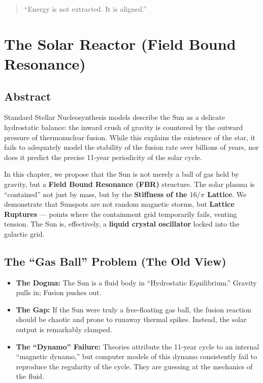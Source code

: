 \documentclass[11pt, letterpaper, openany]{book}
\begin{document}
\begin{quote}
“Energy is not extracted. It is aligned.”
\end{quote}

\chapter{The Solar Reactor (Field Bound Resonance)}

\section{Abstract}

Standard Stellar Nucleosynthesis models describe the Sun as a delicate hydrostatic
balance: the inward crush of gravity is countered by the outward pressure of
thermonuclear fusion. While this explains the existence of the star, it fails to adequately
model the stability of the fusion rate over billions of years, nor does it predict the precise
11-year periodicity of the solar cycle.

In this chapter, we propose that the Sun is not merely a ball of gas held by gravity, but a
\textbf{Field Bound Resonance (FBR)} structure. The solar plasma is “contained” not just by
mass, but by the \textbf{Stiffness of the $16/\pi$ Lattice}. We demonstrate that Sunspots are
not random magnetic storms, but \textbf{Lattice Ruptures} — points where the containment
grid temporarily fails, venting tension. The Sun is, effectively, a \textbf{liquid crystal
oscillator} locked into the galactic grid.

\section{The ``Gas Ball'' Problem (The Old View)}

\begin{itemize}
    \item \textbf{The Dogma:} The Sun is a fluid body in “Hydrostatic Equilibrium.” Gravity pulls in;
    Fusion pushes out.
    \item \textbf{The Gap:} If the Sun were truly a free-floating gas ball, the fusion reaction should be
    chaotic and prone to runaway thermal spikes. Instead, the solar output is remarkably
    clamped.
    \item \textbf{The “Dynamo” Failure:} Theories attribute the 11-year cycle to an internal
    “magnetic dynamo,” but computer models of this dynamo consistently fail to reproduce
    the regularity of the cycle. They are guessing at the mechanics of the fluid.
\end{itemize}
\end{document}
